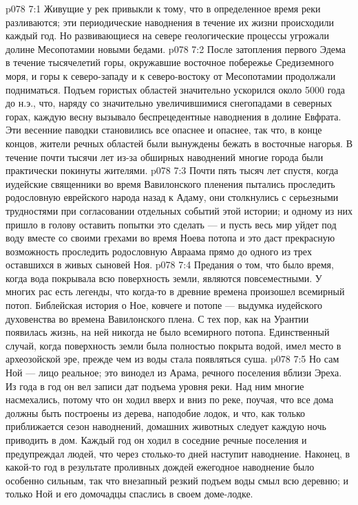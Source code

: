 \vs p078 7:1 Живущие у рек привыкли к тому, что в определенное время реки разливаются; эти периодические наводнения в течение их жизни происходили каждый год. Но развивающиеся на севере геологические процессы угрожали долине Месопотамии новыми бедами.
\vs p078 7:2 После затопления первого Эдема в течение тысячелетий горы, окружавшие восточное побережье Средиземного моря, и горы к северо\hyp{}западу и к северо\hyp{}востоку от Месопотамии продолжали подниматься. Подъем гористых областей значительно ускорился около 5000 года до н.э., что, наряду со значительно увеличившимися снегопадами в северных горах, каждую весну вызывало беспрецедентные наводнения в долине Евфрата. Эти весенние паводки становились все опаснее и опаснее, так что, в конце концов, жители речных областей были вынуждены бежать в восточные нагорья. В течение почти тысячи лет из\hyp{}за обширных наводнений многие города были практически покинуты жителями.
\vs p078 7:3 \pc Почти пять тысяч лет спустя, когда иудейские священники во время Вавилонского пленения пытались проследить родословную еврейского народа назад к Адаму, они столкнулись с серьезными трудностями при согласовании отдельных событий этой истории; и одному из них пришло в голову оставить попытки это сделать --- и пусть весь мир уйдет под воду вместе со своими грехами во время Ноева потопа и это даст прекрасную возможность проследить родословную Авраама прямо до одного из трех оставшихся в живых сыновей Ноя.
\vs p078 7:4 Предания о том, что было время, когда вода покрывала всю поверхность земли, являются повсеместными. У многих рас есть легенды, что когда\hyp{}то в древние времена произошел всемирный потоп. Библейская история о Ное, ковчеге и потопе --- выдумка иудейского духовенства во времена Вавилонского плена. С тех пор, как на Урантии появилась жизнь, на ней никогда не было всемирного потопа. Единственный случай, когда поверхность земли была полностью покрыта водой, имел место в археозойской эре, прежде чем из воды стала появляться суша.
\vs p078 7:5 Но сам Ной --- лицо реальное; это винодел из Арама, речного поселения вблизи Эреха. Из года в год он вел записи дат подъема уровня реки. Над ним многие насмехались, потому что он ходил вверх и вниз по реке, поучая, что все дома должны быть построены из дерева, наподобие лодок, и что, как только приближается сезон наводнений, домашних животных следует каждую ночь приводить в дом. Каждый год он ходил в соседние речные поселения и предупреждал людей, что через столько\hyp{}то дней наступит наводнение. Наконец, в какой\hyp{}то год в результате проливных дождей ежегодное наводнение было особенно сильным, так что внезапный резкий подъем воды смыл всю деревню; и только Ной и его домочадцы спаслись в своем доме\hyp{}лодке.
